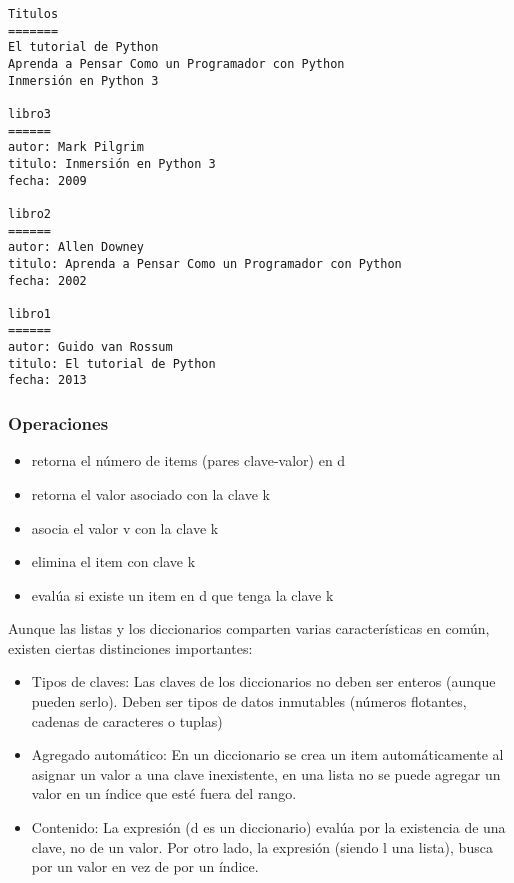 \documentclass[a4paper,12pt,spanish]{sphinxmanual}
\begin{document}
\begin{Verbatim}[commandchars=\\\{\}]
Titulos
=======
El tutorial de Python
Aprenda a Pensar Como un Programador con Python
Inmersión en Python 3

libro3
======
autor: Mark Pilgrim
titulo: Inmersión en Python 3
fecha: 2009

libro2
======
autor: Allen Downey
titulo: Aprenda a Pensar Como un Programador con Python
fecha: 2002

libro1
======
autor: Guido van Rossum
titulo: El tutorial de Python
fecha: 2013
\end{Verbatim}


\subsubsection{Operaciones}
\label{Unidad03:id1}\begin{itemize}
\item {} 
 retorna el número de items (pares clave-valor) en d

\item {} 
 retorna el valor asociado con la clave k

\item {} 
 asocia el valor v con la clave k

\item {} 
 elimina el item con clave k

\item {} 
 evalúa si existe un item en d que tenga la clave k

\end{itemize}

Aunque las listas y los diccionarios comparten varias características en
común, existen ciertas distinciones importantes:
\begin{itemize}
\item {} 
Tipos de claves: Las claves de los diccionarios no deben ser enteros
(aunque pueden serlo). Deben ser tipos de datos inmutables (números
flotantes, cadenas de caracteres o tuplas)

\item {} 
Agregado automático: En un diccionario se crea un item
automáticamente al asignar un valor a una clave inexistente, en una
lista no se puede agregar un valor en un índice que esté fuera del
rango.

\item {} 
Contenido: La expresión  (d es un diccionario) evalúa por
la existencia de una clave, no de un valor. Por otro lado, la
expresión  (siendo l una lista), busca por un valor en vez
de por un índice.

\end{itemize}
\end{document}
